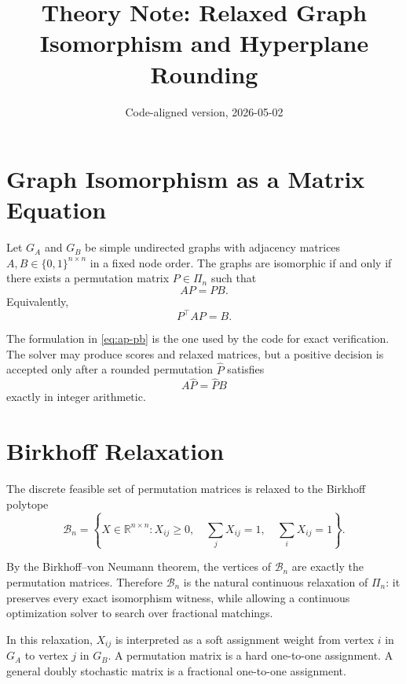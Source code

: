 \documentclass[11pt]{article}
\title{\textbf{Theory Note: Relaxed Graph Isomorphism and Hyperplane Rounding}}
\author{}
\date{Code-aligned version, 2026-05-02}
\begin{document}
\maketitle

\section{Graph Isomorphism as a Matrix Equation}

Let $G_A$ and $G_B$ be simple undirected graphs with adjacency matrices
$A,B\in\{0,1\}^{n\times n}$ in a fixed node order.
The graphs are isomorphic if and only if there exists a permutation matrix
$P\in\Pi_n$ such that
\begin{equation}
    AP = PB.
    \label{eq:ap-pb}
\end{equation}
Equivalently,
\begin{equation}
    P^\top A P = B.
\end{equation}

The formulation in \eqref{eq:ap-pb} is the one used by the code for exact
verification.
The solver may produce scores and relaxed matrices, but a positive decision is
accepted only after a rounded permutation $\hat P$ satisfies
\begin{equation}
    A\hat P = \hat P B
\end{equation}
exactly in integer arithmetic.

\section{Birkhoff Relaxation}

The discrete feasible set of permutation matrices is relaxed to the Birkhoff
polytope
\begin{equation}
    \mathcal{B}_n =
    \left\{
    X \in \mathbb{R}^{n\times n} :
    X_{ij}\ge 0,\quad
    \sum_j X_{ij}=1,\quad
    \sum_i X_{ij}=1
    \right\}.
\end{equation}

By the Birkhoff--von Neumann theorem, the vertices of $\mathcal{B}_n$ are
exactly the permutation matrices.
Therefore $\mathcal{B}_n$ is the natural continuous relaxation of $\Pi_n$:
it preserves every exact isomorphism witness, while allowing a continuous
optimization solver to search over fractional matchings.

In this relaxation, $X_{ij}$ is interpreted as a soft assignment weight from
vertex $i$ in $G_A$ to vertex $j$ in $G_B$.
A permutation matrix is a hard one-to-one assignment.
A general doubly stochastic matrix is a fractional one-to-one assignment.
\end{document}
